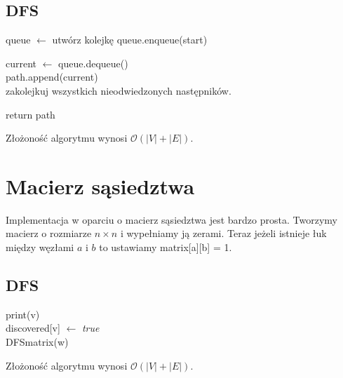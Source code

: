\documentclass[12pt]{article}
\begin{document}
\subsection{DFS}
\begin{algorithm}[H]
\Begin
{
queue $\leftarrow$ utwórz kolejkę queue.enqueue(start) \\
	{
		current $\leftarrow$ 	queue.dequeue()\\
		{
		path.append(current)\\
		zakolejkuj wszystkich nieodwiedzonych następników.
		} 
		
	}
	return path

	
}
\caption{DFS\textunderscore list}
\end{algorithm}	
Złożoność algorytmu wynosi $\mathcal{O}(|V| + |E|)$.


\section{Macierz sąsiedztwa}
Implementacja w oparciu o macierz sąsiedztwa jest bardzo prosta. Tworzymy macierz o rozmiarze $n \times n$ i wypełniamy ją zerami. Teraz jeżeli istnieje łuk między węzłami $a$ i $b$ to ustawiamy matrix[a][b] = 1.

\subsection{DFS}
\begin{algorithm}[H]
\Begin
{
	print(v) \\
	discovered[v] $\leftarrow$ \emph{true} \\
	{
		{
			DFS\textunderscore matrix(w)
		}
	}
}
\caption{DFS\textunderscore matrix}
\end{algorithm}	

Złożoność algorytmu wynosi $\mathcal{O}(|V| + |E|)$.
\end{document}
